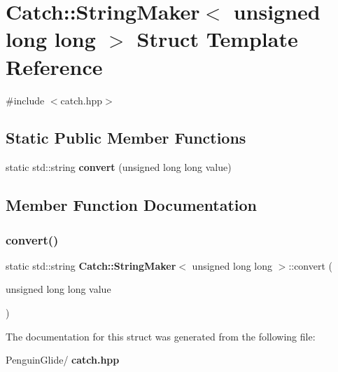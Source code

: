 \section{Catch\+::String\+Maker$<$ unsigned long long $>$ Struct Template Reference}
\label{struct_catch_1_1_string_maker_3_01unsigned_01long_01long_01_4}


{\ttfamily \#include $<$catch.\+hpp$>$}

\subsection*{Static Public Member Functions}
\begin{DoxyCompactItemize}
\item 
static std\+::string \textbf{ convert} (unsigned long long value)
\end{DoxyCompactItemize}


\subsection{Member Function Documentation}
\mbox{\label{struct_catch_1_1_string_maker_3_01unsigned_01long_01long_01_4_a6a8708af4fc8df3f52d7eab779b6bc6f}} 
\subsubsection{convert()}
{\footnotesize\ttfamily static std\+::string \textbf{ Catch\+::\+String\+Maker}$<$ unsigned long long $>$\+::convert (\begin{DoxyParamCaption}\item[{unsigned long long}]{value }\end{DoxyParamCaption})\hspace{0.3cm}{\ttfamily [static]}}



The documentation for this struct was generated from the following file\+:\begin{DoxyCompactItemize}
\item 
Penguin\+Glide/\textbf{ catch.\+hpp}\end{DoxyCompactItemize}
